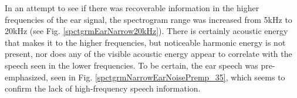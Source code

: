 In an attempt to see if there was recoverable information in the higher frequencies of the ear signal, the spectrogram range was increased from 5kHz to 20kHz (see Fig. \ref{spctgrmEarNarrow20kHz}). There is certainly acoustic energy that makes it to the higher frequencies, but noticeable harmonic energy is not present, nor does any of the visible acoustic energy appear to correlate with the speech seen in the lower frequencies.  \DIFaddbegin {}\DIFaddend To be certain, the ear speech was pre-emphasized, seen in Fig. \ref{spctgrmNarrowEarNoisePremp_35}, which seems to confirm the lack of high-frequency speech information. 
\DIFdelbegin %
